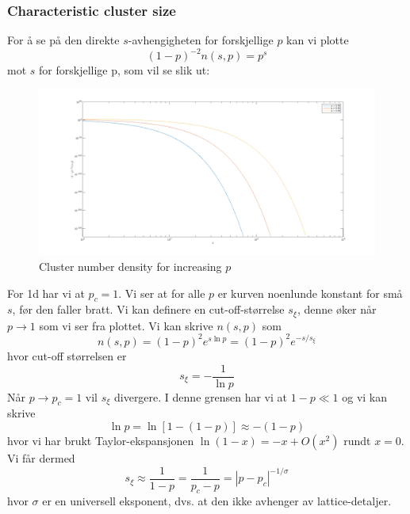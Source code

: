 \documentclass[english, a4paper]{article}
\begin{document}
\subsubsection{Characteristic cluster size}
For å se på den direkte $s$-avhengigheten for forskjellige $p$ kan vi plotte
\begin{equation}
 (1-p)^{-2}n(s,p) = p^s
\end{equation}
mot $s$ for forskjellige p, som vil se slik ut:
\begin{figure}[H]
  \begin{center}
  \includegraphics[width = 140mm]{../Figures/cnd1d.png}
  \caption{Cluster number density for increasing $p$}
  \label{fig:fig8}
  \end{center}
\end{figure}
For 1d har vi at $p_c = 1$. Vi ser at for alle $p$ er kurven noenlunde konstant for små $s$, før den faller
bratt. Vi kan definere en cut-off-størrelse $s_\xi$, denne øker når $p\to 1$ som vi ser fra plottet.
Vi kan skrive $n(s,p)$ som
\begin{equation}
 n(s,p) = (1-p)^2e^{s\ln{p}} = (1-p)^2e^{-s/s_\xi}
\end{equation}
hvor cut-off størrelsen er 
\begin{equation}
 s_\xi = -\frac{1}{\ln{p}}
\end{equation}
Når $p \to p_c = 1$ vil $s_\xi$ divergere. I denne grensen har vi at $1-p \ll 1$ og vi kan skrive
\begin{equation}
 \ln{p} = \ln{[1 - (1-p)]} \approx -(1-p)
\end{equation}
hvor vi har brukt Taylor-ekspansjonen $\ln{(1-x)} = -x + O(x^2)$ rundt $x=0$. Vi får dermed
\begin{equation}
 s_\xi \approx \frac{1}{1-p} = \frac{1}{p_c - p} = |p-p_c|^{-1/\sigma}
\end{equation}
hvor $\sigma$ er en universell eksponent, dvs. at den ikke avhenger av lattice-detaljer. 
\end{document}

